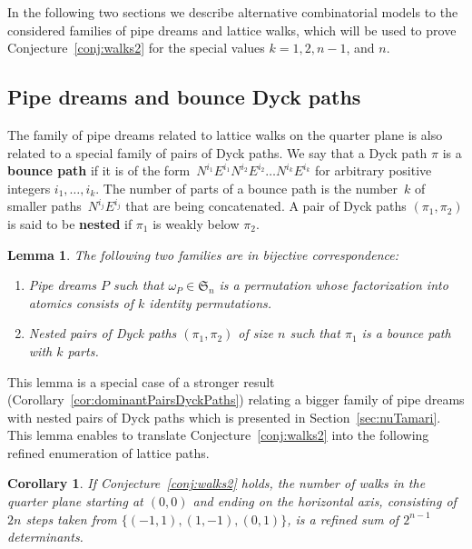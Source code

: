 \documentclass{amsart}
\newtheorem{corollary}[theorem]{Corollary}
\newtheorem{lemma}[theorem]{Lemma}
\theoremstyle{definition}
\newcommand{\defn}[1]{\textbf{\textsf{\color{PineGreen} #1}}} %
\newcommand{\fS}{\mathfrak{S}} %
\begin{document}
In the following two sections we describe alternative combinatorial models to the considered families of pipe dreams and lattice walks, which will be used to prove Conjecture~\ref{conj:walks2} for the special values $k=1,2,n-1$, and $n$.


\subsection{Pipe dreams and bounce Dyck paths}
\label{subsec:bouncepairs}

The family of pipe dreams related to lattice walks on the quarter plane is also related to a special family of pairs of Dyck paths.
We say that a Dyck path $\pi$ is a \defn{bounce path} if it is of the form~$N^{i_1}E^{i_1} N^{i_2}E^{i_2} \dots N^{i_k}E^{i_k}$ for arbitrary positive integers $i_1, \dots, i_k$.
The number of parts of a bounce path is the number~$k$ of smaller paths~$N^{i_j}E^{i_j}$ that are being concatenated. 
A pair of Dyck paths $(\pi_1,\pi_2)$ is said to be \defn{nested} if $\pi_1$ is weakly below $\pi_2$.

\begin{lemma}
\label{lem:bouncepairs}
The following two families are in bijective correspondence:
\begin{enumerate}
\item Pipe dreams $P$ such that $\omega_P\in \fS_n$ is a permutation whose factorization into atomics consists of $k$ identity permutations.
\item Nested pairs of Dyck paths $(\pi_1,\pi_2)$ of size $n$ such that $\pi_1$ is a bounce path with $k$ parts.
\end{enumerate}
\end{lemma}

This lemma is a special case of a stronger result (Corollary~\ref{cor:dominantPairsDyckPaths}) relating a bigger family of pipe dreams with nested pairs of Dyck paths which is presented in Section~\ref{sec:nuTamari}.
This lemma enables to translate Conjecture~\ref{conj:walks2} into the following refined enumeration of lattice paths.

\begin{corollary}
\label{cor:walksEnumerationDeterminants}
If Conjecture~\ref{conj:walks2} holds, the number of walks in the quarter plane starting at $(0,0)$ and ending on the horizontal axis, consisting of $2n$ steps taken from $\{(-1, 1), (1, -1), (0, 1)\}$, is a refined sum of $2^{n-1}$ determinants. 
\end{corollary}
\end{document}
